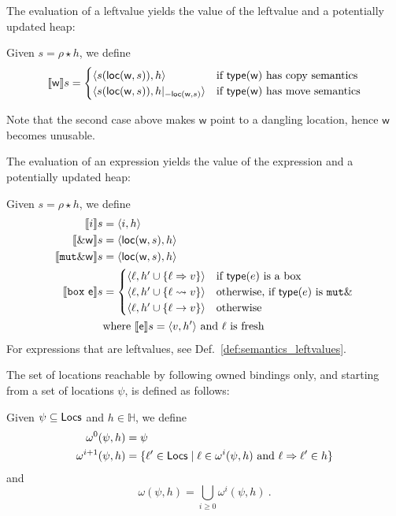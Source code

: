 The evaluation of a leftvalue yields the value of the leftvalue and a potentially updated heap:

\begin{definition}\label{def:semantics_leftvalues}
  Given $s=\rho\star h$, we define
  \[
  \den[\mathsf{w}]{s}=\begin{cases}
  \langle s(\loc(\mathsf{w},s)), h\rangle & \text{if $\type(\mathsf{w})$ has copy semantics}\\
  \langle s(\loc(\mathsf{w},s)), h|_{-\loc(\mathsf{w},s)}\rangle & \text{if $\type(\mathsf{w})$ has move semantics}
  \end{cases}
  \]
\end{definition}

\noindent
Note that the second case above makes $\mathsf{w}$ point to a dangling location, hence
$\mathsf{w}$ becomes unusable.

The evaluation of an expression yields the value of the expression and a potentially updated heap:

\begin{definition}\label{def:semantics_expressions}
  Given $s=\rho\star h$, we define
  \begin{align*}
    \den[i]{s}&=\langle i,h\rangle\\
    \den[\borrow\mathsf{w}]{s}&=\langle\loc(\mathsf{w},s),h\rangle\\
    \den[\mathtt{mut}\borrow\mathsf{w}]{s}&=\langle\loc(\mathsf{w},s),h\rangle\\
    \den[\mathtt{box}\ \mathsf{e}]{s}&=
    \begin{cases}
      \langle\ell,h'\cup\{\ell\Rightarrow v\}\rangle & \text{if $\type(e)$ is a box}\\
      \langle\ell,h'\cup\{\ell\leadsto v\}\rangle & \text{otherwise, if $\type(e)$ is $\mathtt{mut}\borrow$}\\
      \langle\ell,h'\cup\{\ell\to v\}\rangle & \text{otherwise}
    \end{cases}\\
    & \text{where $\den[\mathsf{e}]{s}=\langle v, h'\rangle$ and $\ell$ is fresh}
  \end{align*}
  For expressions that are leftvalues, see Def.~\ref{def:semantics_leftvalues}.
\end{definition}

The set of locations reachable by following owned bindings only, and starting from a set of locations $\psi$,
is defined as follows:
%
\begin{definition}
  Given $\psi\subseteq\Locs$ and $h\in\mathbb{H}$, we define
  \begin{align*}
  \omega^0(\psi,h)&=\psi\\ %
  \omega^{i+1}(\psi,h)&=\{\ell'\in\Locs\mid\ell\in\omega^i(\psi,h)\text{ and }\ell\Rightarrow\ell'\in h\}
  \end{align*}
  and
  \[
  \omega(\psi,h)=\bigcup\limits_{i\ge 0}\omega^i(\psi,h)~.
  \]
\end{definition}

